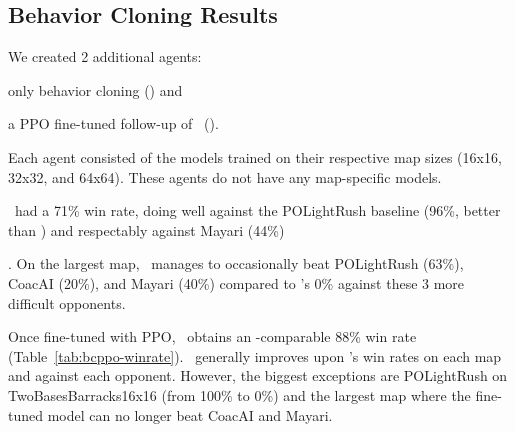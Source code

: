 \documentclass[conference]{IEEEtran}
\newif\ifsupplemental
\newcommand{\supptableref}[1]{%
  \ifsupplemental
    \ (Supplemental Table~\ref{#1})%
  \fi
}
\newcommand{\mapname}[1]{#1} %
\newcounter{supptable}
\begin{document}
\subsection{Behavior Cloning Results}
\label{sec:behavior-cloning-results}
We created 2 additional agents:
\begin{inparaenum}[(1)]
    \item only behavior cloning (\bcAgent) and
    \item a PPO fine-tuned follow-up of \bcAgent\ (\bcPPOAgent).
\end{inparaenum}
Each agent consisted of the models trained on their
respective map sizes (16x16, 32x32, and 64x64). These agents do not have any
map-specific models.

\bcAgent\ had a 71\% win rate, doing well against the POLightRush baseline (96\%, better than \agentName) and respectably against
Mayari (44\%)\supptableref{tab:bc-winrate}. On the largest map, \bcAgent\ manages to occasionally beat POLightRush (63\%), CoacAI
(20\%), and Mayari (40\%) compared to \agentName's 0\% against these 3 more difficult opponents.

Once fine-tuned with PPO, \bcPPOAgent\ obtains an \agentName-comparable 88\% win rate
(Table~\ref{tab:bcppo-winrate}). \bcPPOAgent\ generally improves upon \bcAgent's win
rates on each map and against each opponent. However, the biggest exceptions are
POLightRush on \mapname{TwoBasesBarracks16x16} (from 100\% to 0\%) and the largest map
where the fine-tuned model can no longer beat CoacAI and Mayari.
\end{document}
